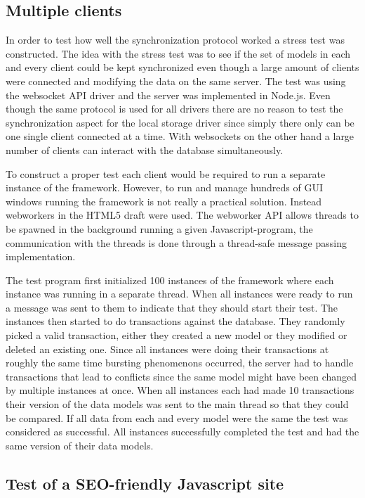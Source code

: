 \subsection{Multiple clients}
In order to test how well the synchronization protocol worked a stress test was constructed. The idea with the stress test was to see if the set of models in each and every client could be kept synchronized even though a large amount of clients were connected and modifying the data on the same server. The test was using the websocket API driver and the server was implemented in Node.js. Even though the same protocol is used for all drivers there are no reason to test the synchronization aspect for the local storage driver since simply there only can be one single client connected at a time. With websockets on the other hand a large number of clients can interact with the database simultaneously.

To construct a proper test each client would be required to run a separate instance of the framework. However, to run and manage hundreds of GUI windows running the framework is not really a practical solution. Instead webworkers in the HTML5 draft were used. The webworker API allows threads to be spawned in the background running a given Javascript-program, the communication with the threads is done through a thread-safe message passing implementation. 

The test program first initialized 100 instances of the framework where each instance was running in a separate thread. When all instances were ready to run a message was sent to them to indicate that they should start their test. The instances then started to do transactions against the database. They randomly picked a valid transaction, either they created a new model or they modified or deleted an existing one. Since all instances were doing their transactions at roughly the same time bursting phenomenons occurred, the server had to handle transactions that lead to conflicts since the same model might have been changed by multiple instances at once. When all instances each had made 10 transactions their version of the data models was sent to the main thread so that they could be compared. If all data from each and every model were the same the test was considered as successful. All instances successfully completed the test and had the same version of their data models.

\subsection{Test of a SEO-friendly Javascript site}

